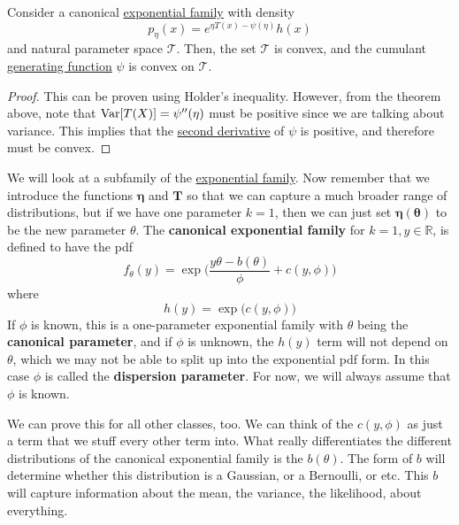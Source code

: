     \begin{theorem}[Convexity]
      \label{thm:convexity}
    Consider a canonical \hyperref[def:exponential-family]{exponential family} with density 
    \begin{equation}
      p_\eta (x) = e^{\eta T(x) - \psi(\eta)} h(x)
    \end{equation}
    and natural parameter space $\mathcal{T}$. Then, the set $\mathcal{T}$ is convex, and the cumulant \hyperref[sp-def:generating-function]{generating function} $\psi$ is convex on $\mathcal{T}$. 
    \end{theorem}
    \begin{proof}
    This can be proven using Holder's inequality. However, from the theorem above, note that $\operatorname{Var}[T(X)] = \psi^{\prime\prime}(\eta)$ must be positive since we are talking about variance. This implies that the \hyperref[mv-def:second-derivative]{second derivative} of $\psi$ is positive, and therefore must be convex. 
    \end{proof}

    We will look at a subfamily of the \hyperref[def:exponential-family]{exponential family}. Now remember that we introduce the functions $\boldsymbol{\eta}$ and $\mathbf{T}$ so that we can capture a much broader range of distributions, but if we have one parameter $k = 1$, then we can just set $\boldsymbol{\eta}(\boldsymbol{\theta})$ to be the new parameter $\theta$. The \textbf{canonical exponential family} for $k = 1, y \in \mathbb{R}$, is defined to have the pdf 
    \begin{equation}
      f_\theta (y) = \exp \bigg( \frac{y \theta - b(\theta)}{\phi} + c(y, \phi) \bigg)
    \end{equation}
    where 
    \begin{equation}
      h(y) = \exp \big( c(y, \phi)\big)
    \end{equation}
    If $\phi$ is known, this is a one-parameter exponential family with $\theta$ being the \textbf{canonical parameter}, and if $\phi$ is unknown, the $h(y)$ term will not depend on $\theta$, which we may not be able to split up into the exponential pdf form. In this case $\phi$ is called the \textbf{dispersion parameter}. For now, we will always assume that $\phi$ is known. 

    We can prove this for all other classes, too. We can think of the $c(y, \phi)$ as just a term that we stuff every other term into. What really differentiates the different distributions of the canonical exponential family is the $b(\theta)$. The form of $b$ will determine whether this distribution is a Gaussian, or a Bernoulli, or etc. This $b$ will capture information about the mean, the variance, the likelihood, about everything. 

